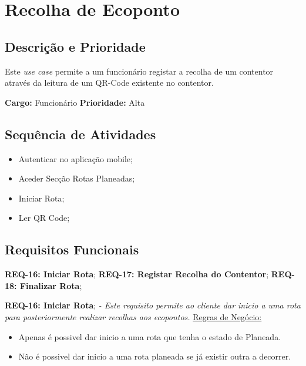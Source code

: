 \documentclass{scrreprt}
\begin{document}
	\section{Recolha de Ecoponto}
	\subsection{Descrição e Prioridade}
	Este \textit{use case} permite a um funcionário registar a recolha de um contentor através da leitura de um QR-Code existente no contentor. 
	 \newline
			
	\textbf{Cargo: }Funcionário  \newline
	\textbf{Prioridade: }Alta \newline
	\subsection{Sequência de Atividades}
		\begin{itemize}
		\item Autenticar no aplicação mobile;
		\item Aceder Secção Rotas Planeadas;
		\item Iniciar Rota;
		\item Ler QR Code;

	\end{itemize}
	
	\subsection{Requisitos Funcionais}
	\textbf{REQ-16: Iniciar Rota};\newline
	\textbf{REQ-17: Registar Recolha do Contentor};\newline
	\textbf{REQ-18: Finalizar Rota};\newline
	
	\textbf{REQ-16: Iniciar Rota};\newline
	\textit{- Este requisito permite ao cliente dar inicio a uma rota para posteriormente realizar recolhas aos ecopontos.}
	 \newline\newline
		\underline{Regras de Negócio: }
		\begin{itemize}
		\item Apenas é possivel dar inicio a uma rota que tenha o estado de Planeada.
		\item Não é possivel dar inicio a uma rota planeada se já existir outra a decorrer.
	\end{itemize}
	
\end{document}
